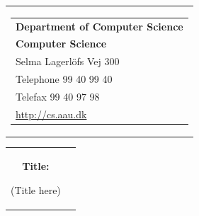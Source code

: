 \thispagestyle{empty}
\begin{titlepage}
\begin{nopagebreak}
{\samepage 
\begin{tabular}{r}
\parbox{\textwidth}{  
\hfill \parbox{5.9cm}{\begin{tabular}{l}
{\sf\small \textbf{Department of Computer Science}}\\
{\sf\small  \textbf{Computer Science}} \\
{\sf\small Selma Lagerl\"{o}fs Vej 300} \\
{\sf\small Telephone 99 40 99 40} \\
{\sf\small Telefax 99 40 97 98} \\
{\sf\small \url{http://cs.aau.dk}}
\end{tabular}}}
\\
\end{tabular}

\begin{tabular}{cc}
\parbox{7cm}{
\begin{description}

\item {\bf Title:} 

(Title here)

\end{description}

\parbox{8cm}{

}}
\end{tabular}}
\end{nopagebreak}
\end{titlepage}
